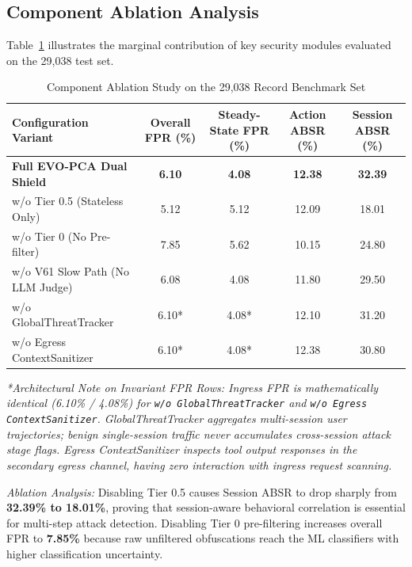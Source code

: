 \documentclass[conference]{IEEEtran}
\begin{document}
\subsection{Component Ablation Analysis}
Table~\ref{tab:ablation} illustrates the marginal contribution of key security modules evaluated on the 29,038 test set.

\begin{table}[htbp]
\caption{Component Ablation Study on the 29,038 Record Benchmark Set}
\label{tab:ablation}
\centering
\begin{tabular}{lcccc}
\toprule
\textbf{Configuration Variant} & \textbf{Overall FPR (\%)} & \textbf{Steady-State FPR (\%)} & \textbf{Action ABSR (\%)} & \textbf{Session ABSR (\%)} \\
\midrule
\textbf{Full EVO-PCA Dual Shield} & \textbf{6.10} & \textbf{4.08} & \textbf{12.38} & \textbf{32.39} \\
w/o Tier 0.5 (Stateless Only) & 5.12 & 5.12 & 12.09 & 18.01 \\
w/o Tier 0 (No Pre-filter) & 7.85 & 5.62 & 10.15 & 24.80 \\
w/o V61 Slow Path (No LLM Judge) & 6.08 & 4.08 & 11.80 & 29.50 \\
w/o GlobalThreatTracker & 6.10* & 4.08* & 12.10 & 31.20 \\
w/o Egress ContextSanitizer & 6.10* & 4.08* & 12.38 & 30.80 \\
\bottomrule
\end{tabular}
\end{table}

\textit{*Architectural Note on Invariant FPR Rows: Ingress FPR is mathematically identical (6.10\% / 4.08\%) for \texttt{w/o GlobalThreatTracker} and \texttt{w/o Egress ContextSanitizer}. GlobalThreatTracker aggregates multi-session user trajectories; benign single-session traffic never accumulates cross-session attack stage flags. Egress ContextSanitizer inspects tool output responses in the secondary egress channel, having zero interaction with ingress request scanning.}

\textit{Ablation Analysis:} Disabling Tier 0.5 causes Session ABSR to drop sharply from \textbf{32.39\% to 18.01\%}, proving that session-aware behavioral correlation is essential for multi-step attack detection. Disabling Tier 0 pre-filtering increases overall FPR to \textbf{7.85\%} because raw unfiltered obfuscations reach the ML classifiers with higher classification uncertainty.
\end{document}
